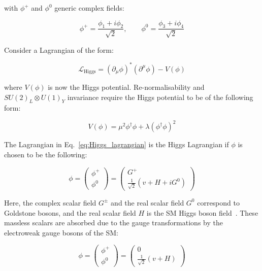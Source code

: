 			\noindent with $\phi^+$ and $\phi^0$ generic complex fields: 

			\begin{equation}
				\phi^+ = \frac{\phi_1 + i \phi_2}{\sqrt{2}},  \qquad \phi^0 = \frac{\phi_3 + i \phi_4}{\sqrt{2}}
			\end{equation}

			\noindent Consider a Lagrangian of the form: 

			\begin{equation}
			\label{eq:Higgs_lagrangian}
				\mathcal{L_{\mathrm{Higgs}}} = ( \partial_{\mu} \phi )^* \left ( \partial^{\mu} \phi \right ) - V(\phi)
			\end{equation}

			\noindent where $V(\phi)$ is now the Higgs potential. Re-normalisability and $SU(2)_L \otimes U(1)_Y$ invariance require the Higgs potential to be of the following form: 

			\begin{equation}
			\label{eq:Higgs_potential}
				V(\phi) = \mu^2  \phi^\dagger \phi + \lambda \left ( \phi^\dagger \phi \right )^2 
			\end{equation}

			\noindent The Lagrangian in Eq.~\ref{eq:Higgs_lagrangian} is the Higgs Lagrangian if $\phi$ is chosen to be the following:

			\begin{equation*}
				\phi = 
				\begin{pmatrix}
					\phi^+ \\ \phi^0
				\end{pmatrix} 
				=
				\begin{pmatrix}
					G^+ \\ \frac{1}{\sqrt{2}} \left ( v + H + iG^0 \right )
				\end{pmatrix}
			\end{equation*}

			\noindent Here, the complex scalar field $G^\pm$ and the real scalar field $G^0$ correspond to Goldstone bosons, and the real scalar field $H$ is the \ac{SM} Higgs boson field~\cite{Goldstone1962}. These massless scalars are absorbed due to the gauge transformations by the electroweak gauge bosons of the \ac{SM}:

			\begin{equation}
			\label{eq:Higgs_doublet}
				\phi = 
				\begin{pmatrix}
					\phi^+ \\ \phi^0
				\end{pmatrix} 
				=
				\begin{pmatrix}
					0 \\ \frac{1}{\sqrt{2}} \left ( v + H \right )
				\end{pmatrix}
			\end{equation}

